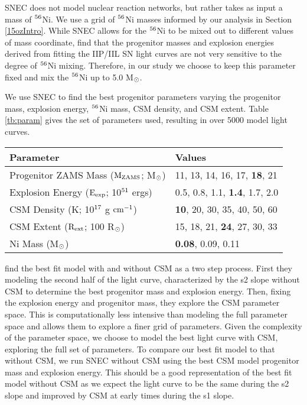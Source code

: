 \documentclass[a4paper,fleqn,usenatbib]{mnras}
\newcommand{\msunperiod}{M$\rm{_{\odot}}$}
\begin{document}
SNEC does not model nuclear reaction networks, but rather takes as input a mass of $\rm{{}^{56}}$Ni. 
We use a grid of $\rm{{}^{56}}$Ni masses informed by our analysis in Section \ref{15ozIntro}.
While SNEC allows for the $\rm{{}^{56}}$Ni to be mixed out to different values of mass coordinate, \citet{2017morozova} find that the progenitor masses and explosion energies derived from fitting the IIP/IIL SN light curves are not very sensitive to the degree of $\rm{{}^{56}}$Ni mixing.
Therefore, in our study we choose to keep this parameter fixed and mix the $\rm{{}^{56}}$Ni up to 5.0 M$\rm{_{\odot}}$.

We use SNEC to find the best progenitor parameters varying the progenitor mass, explosion energy, $\rm{{}^{56}}$Ni mass, CSM density, and CSM extent. 
Table \ref{tb:param} gives the set of parameters used, resulting in over 5000 model light curves.
\begin{table*}
\centering
\caption{The grid of parameters used by SNEC. 
The values that best fit the data are in bold.}
\label{tb:param}
\begin{tabular}{l|l}
\hline
Parameter & Values \\
\hline
Progenitor ZAMS Mass ($\rm{M_{ZAMS}}$; \msunperiod) & 11, 13, 14, 16, 17, {\bf 18}, 21 \\
Explosion Energy ($\rm{E_{exp}}$; 10$\rm{^{51}}$ ergs) & 0.5, 0.8, 1.1, {\bf 1.4}, 1.7, 2.0 \\
CSM Density (K; 10$\rm{^{17}}$ g $\rm{cm^{-1}}$) & {\bf 10}, 20, 30, 35, 40, 50, 60 \\
CSM Extent ($\rm{R_{ext}}$; 100 R$\rm{_{\odot}}$) & 15, 18, 21, {\bf 24}, 27, 30, 33 \\
Ni Mass (\msunperiod) & {\bf 0.08}, 0.09, 0.11 \\
\hline
\end{tabular}
\end{table*}
\citet{2018morozova} find the best fit model with and without CSM as a two step process. 
First they modeling the second half of the light curve, characterized by the s2 slope without CSM to determine the best progenitor mass and explosion energy. 
Then, fixing the explosion energy and progenitor mass, they explore the CSM parameter space. 
This is computationally less intensive than modeling the full parameter space and allows them to explore a finer grid of parameters.
Given the complexity of the parameter space, we choose to model the best light curve with CSM, exploring the full set of parameters. 
To compare our best fit model to that without CSM, we run SNEC without CSM using the best CSM model progenitor mass and explosion energy.
This should be a good representation of the best fit model without CSM as we expect the light curve to be the same during the s2 slope and improved by CSM at early times during the s1 slope.
\end{document}
